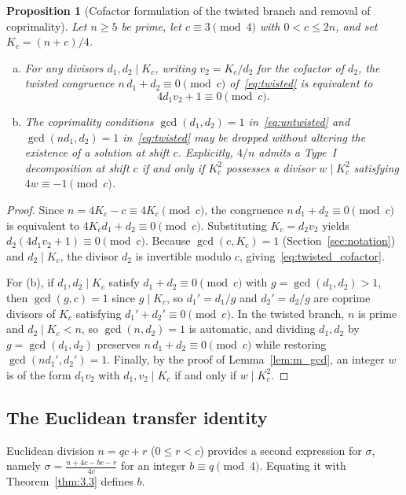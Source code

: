 \documentclass[11pt, a4paper]{article}
\theoremstyle{plain}
\newtheorem{proposition}[theorem]{Proposition}
\theoremstyle{definition}
\begin{document}
\begin{proposition}[Cofactor formulation of the twisted branch and removal of coprimality]\label{prop:twisted_cofactor}
Let $n\ge5$ be prime, let $c\equiv3\pmod4$ with $0<c\le2n$, and set $K_c=(n+c)/4$.
\begin{enumerate}[(a)]
    \item For any divisors $d_1,d_2\mid K_c$, writing $v_2=K_c/d_2$ for the cofactor of $d_2$, the twisted congruence $n\,d_1+d_2\equiv0\pmod c$ of~\eqref{eq:twisted} is equivalent to
    \begin{equation}\label{eq:twisted_cofactor}
    4d_1 v_2 + 1 \equiv 0 \pmod c .
    \end{equation}
    \item The coprimality conditions $\gcd(d_1,d_2)=1$ in~\eqref{eq:untwisted} and $\gcd(n d_1,d_2)=1$ in~\eqref{eq:twisted} may be dropped without altering the existence of a solution at shift $c$. Explicitly, $4/n$ admits a Type~I decomposition at shift $c$ if and only if $K_c^{2}$ possesses a divisor $w\mid K_c^{2}$ satisfying $4w\equiv-1\pmod c$.
\end{enumerate}
\end{proposition}
\begin{proof}
Since $n=4K_c-c\equiv4K_c\pmod c$, the congruence $n\,d_1+d_2\equiv0\pmod c$ is equivalent to $4K_c d_1+d_2\equiv0\pmod c$. Substituting $K_c=d_2 v_2$ yields $d_2(4d_1 v_2+1)\equiv0\pmod c$. Because $\gcd(c,K_c)=1$ (Section~\ref{sec:notation}) and $d_2\mid K_c$, the divisor $d_2$ is invertible modulo $c$, giving~\eqref{eq:twisted_cofactor}.

For (b), if $d_1,d_2\mid K_c$ satisfy $d_1+d_2\equiv0\pmod c$ with $g=\gcd(d_1,d_2)>1$, then $\gcd(g,c)=1$ since $g\mid K_c$, so $d_1'=d_1/g$ and $d_2'=d_2/g$ are coprime divisors of $K_c$ satisfying $d_1'+d_2'\equiv0\pmod c$. In the twisted branch, $n$ is prime and $d_2\mid K_c<n$, so $\gcd(n,d_2)=1$ is automatic, and dividing $d_1,d_2$ by $g=\gcd(d_1,d_2)$ preserves $n\,d_1+d_2\equiv0\pmod c$ while restoring $\gcd(n d_1',d_2')=1$. Finally, by the proof of Lemma~\ref{lem:m_gcd}, an integer $w$ is of the form $d_1 v_2$ with $d_1,v_2\mid K_c$ if and only if $w\mid K_c^{2}$.
\end{proof}

\subsection{The Euclidean transfer identity}\label{sec:3.3}
Euclidean division $n = qc + r$ ($0 \le r < c$) provides a second expression for $\sigma$, namely $\sigma = \frac{n+4c-bc-r}{4c}$ for an integer $b \equiv q \pmod{4}$. Equating it with Theorem~\ref{thm:3.3} defines $b$.
\end{document}

